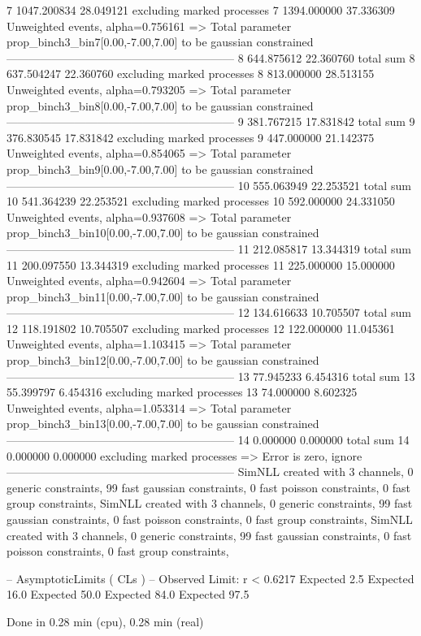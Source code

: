 7          1047.200834     28.049121       excluding marked processes    
7          1394.000000     37.336309       Unweighted events, alpha=0.756161
  => Total parameter prop_binch3_bin7[0.00,-7.00,7.00] to be gaussian constrained
------------------------------------------------------------
8          644.875612      22.360760       total sum                     
8          637.504247      22.360760       excluding marked processes    
8          813.000000      28.513155       Unweighted events, alpha=0.793205
  => Total parameter prop_binch3_bin8[0.00,-7.00,7.00] to be gaussian constrained
------------------------------------------------------------
9          381.767215      17.831842       total sum                     
9          376.830545      17.831842       excluding marked processes    
9          447.000000      21.142375       Unweighted events, alpha=0.854065
  => Total parameter prop_binch3_bin9[0.00,-7.00,7.00] to be gaussian constrained
------------------------------------------------------------
10         555.063949      22.253521       total sum                     
10         541.364239      22.253521       excluding marked processes    
10         592.000000      24.331050       Unweighted events, alpha=0.937608
  => Total parameter prop_binch3_bin10[0.00,-7.00,7.00] to be gaussian constrained
------------------------------------------------------------
11         212.085817      13.344319       total sum                     
11         200.097550      13.344319       excluding marked processes    
11         225.000000      15.000000       Unweighted events, alpha=0.942604
  => Total parameter prop_binch3_bin11[0.00,-7.00,7.00] to be gaussian constrained
------------------------------------------------------------
12         134.616633      10.705507       total sum                     
12         118.191802      10.705507       excluding marked processes    
12         122.000000      11.045361       Unweighted events, alpha=1.103415
  => Total parameter prop_binch3_bin12[0.00,-7.00,7.00] to be gaussian constrained
------------------------------------------------------------
13         77.945233       6.454316        total sum                     
13         55.399797       6.454316        excluding marked processes    
13         74.000000       8.602325        Unweighted events, alpha=1.053314
  => Total parameter prop_binch3_bin13[0.00,-7.00,7.00] to be gaussian constrained
------------------------------------------------------------
14         0.000000        0.000000        total sum                     
14         0.000000        0.000000        excluding marked processes    
  => Error is zero, ignore      
------------------------------------------------------------
SimNLL created with 3 channels, 0 generic constraints, 99 fast gaussian constraints, 0 fast poisson constraints, 0 fast group constraints, 
SimNLL created with 3 channels, 0 generic constraints, 99 fast gaussian constraints, 0 fast poisson constraints, 0 fast group constraints, 
SimNLL created with 3 channels, 0 generic constraints, 99 fast gaussian constraints, 0 fast poisson constraints, 0 fast group constraints, 

 -- AsymptoticLimits ( CLs ) --
Observed Limit: r < 0.6217
Expected  2.5%
Expected 16.0%
Expected 50.0%
Expected 84.0%
Expected 97.5%

Done in 0.28 min (cpu), 0.28 min (real)
